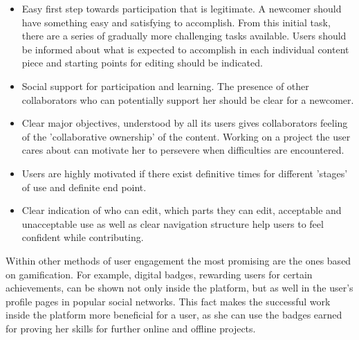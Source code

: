 \documentclass[ngerman,UKenglish,table]{scrbook}
\begin{document}
\begin{itemize}
\item Easy first step towards participation that is legitimate.
A newcomer should have something easy and satisfying to accomplish.
From this initial task, there are a series of gradually more challenging tasks available.
Users should be informed about what is expected to accomplish in each individual content piece and starting points for editing should be indicated.
\item Social support for participation and learning.
The presence of other collaborators who can potentially support her should be clear for a newcomer.
\item Clear major objectives, understood by all its users gives collaborators feeling of the 'collaborative ownership' of the content.
Working on a project the user cares about can motivate her to persevere when difficulties are encountered.
\item Users are highly motivated if there exist definitive times for different 'stages' of use and definite end point.
\item Clear indication of who can edit, which parts they can edit, acceptable and unacceptable use as well as clear navigation structure help users to feel confident while contributing.
\end{itemize}

Within other methods of user engagement the most promising are the ones based on gamification.
For example, digital badges, rewarding users for certain achievements, can be shown not only inside the platform, but as well in the user's profile pages in popular social networks.
This fact makes the successful work inside the platform more beneficial for a user, as she can use the badges earned for proving her skills for further online and offline projects. 




\end{document}
